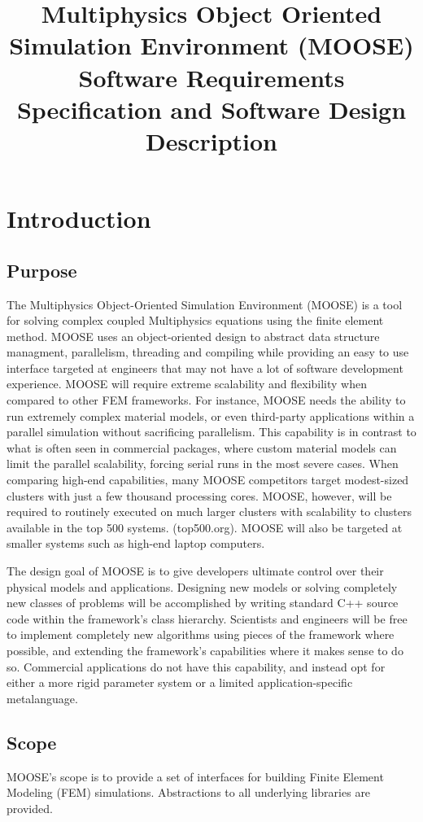 \documentclass{INLreport}
\title{Multiphysics Object Oriented Simulation Environment (MOOSE) Software Requirements Specification and Software Design Description}
\begin{document}
\maketitle

\SANDmain

\section{Introduction}
\subsection{Purpose}
The Multiphysics Object-Oriented Simulation Environment (MOOSE) is a tool for solving complex coupled Multiphysics equations
using the finite element method. MOOSE uses an object-oriented design to abstract data structure managment, parallelism,
threading and compiling while providing an easy to use interface targeted at engineers that may not have a lot of
software development experience. MOOSE will require extreme scalability and flexibility when compared to other FEM
frameworks. For instance, MOOSE needs the ability to run extremely complex material models, or even third-party applications
within a parallel simulation without sacrificing parallelism. This capability is in contrast to what is often seen in
commercial packages, where custom material models can limit the parallel scalability, forcing serial runs in the most severe
cases. When comparing high-end capabilities, many MOOSE competitors target modest-sized clusters with just a few thousand
processing cores. MOOSE, however, will be required to routinely executed on much larger clusters with scalability to clusters
available in the top 500 systems. (top500.org). MOOSE will also be targeted at smaller systems such as high-end laptop
computers.

The design goal of MOOSE is to give developers ultimate control over their physical models and applications. Designing new
models or solving completely new classes of problems will be accomplished by writing standard C++ source code within the
framework’s class hierarchy. Scientists and engineers will be free to implement completely new algorithms using pieces of the
framework where possible, and extending the framework’s capabilities where it makes sense to do so. Commercial applications do
not have this capability, and instead opt for either a more rigid parameter system or a limited application-specific metalanguage.

\subsection{Scope}
MOOSE's scope is to provide a set of interfaces for building Finite Element Modeling (FEM) simulations. Abstractions to all
underlying libraries are provided.
\end{document}
